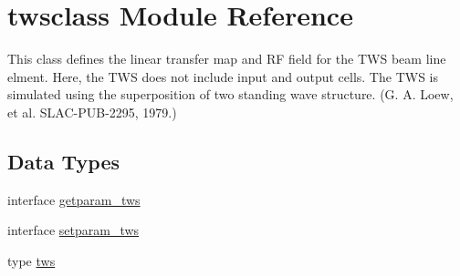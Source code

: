 \hypertarget{namespacetwsclass}{}\section{twsclass Module Reference}
\label{namespacetwsclass}


This class defines the linear transfer map and RF field for the T\+WS beam line elment. Here, the T\+WS does not include input and output cells. The T\+WS is simulated using the superposition of two standing wave structure. (G. A. Loew, et al. S\+L\+A\+C-\/\+P\+U\+B-\/2295, 1979.)  


\subsection*{Data Types}
\begin{DoxyCompactItemize}
\item 
interface \mbox{\hyperlink{interfacetwsclass_1_1getparam__tws}{getparam\+\_\+tws}}
\item 
interface \mbox{\hyperlink{interfacetwsclass_1_1setparam__tws}{setparam\+\_\+tws}}
\item 
type \mbox{\hyperlink{namespacetwsclass_structtwsclass_1_1tws}{tws}}
\end{DoxyCompactItemize}

